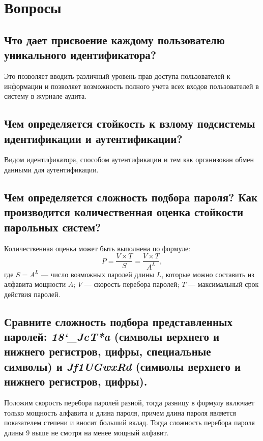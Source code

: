 \section{Вопросы}

\subsection{Что дает присвоение каждому пользователю
  уникального идентификатора?}

  Это позволяет вводить различный уровень прав доступа пользователей к
  информации и позволяет возможность полного учета всех входов пользователей в
  систему в журнале аудита.

\subsection{Чем определяется стойкость к взлому подсистемы
  идентификации и аутентификации?}

  Видом идентификатора, способом аутентификации и тем как организован обмен
  данными для аутентификации.

\subsection{Чем определяется сложность подбора пароля? Как
  производится количественная оценка стойкости парольных
  систем?}

  Количественная оценка может быть выполнена по формуле:
  \begin{equation}
    P = \frac{V\times T}{S} = \frac{V\times T}{A^L},
  \end{equation}
  где $S=A^L$ --- число возможных паролей длины $L$, которые можно составить из
  алфавита мощности $A$; $V$ --- скорость перебора паролей; $T$ ---
  максимальный срок действия паролей.

\subsection{Сравните сложность подбора представленных паролей:
  \textit{18\char`_JcT*a} (символы верхнего и нижнего регистров, цифры,
  специальные символы) и \textit{Jf1UGwxRd} (символы верхнего и нижнего
  регистров, цифры).}

  Положим скорость перебора паролей разной, тогда разницу в формулу включает
  только мощность алфавита и длина пароля, причем длина пароля является
  показателем степени и вносит больший вклад. Тогда сложность перебора пароля
  длины 9 выше не смотря на менее мощный алфавит.

